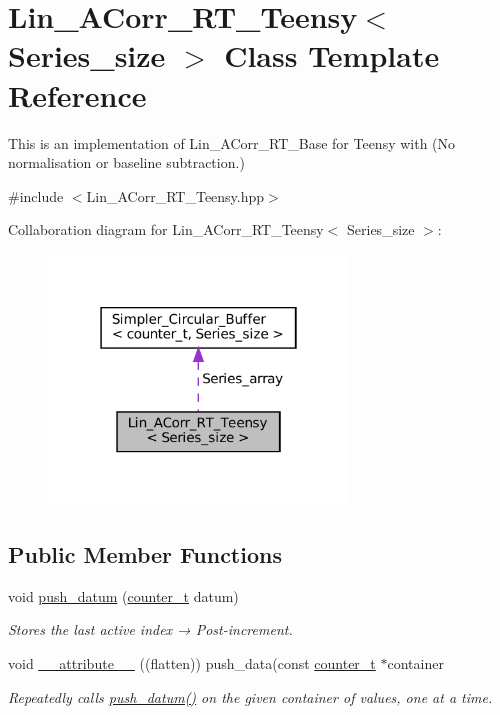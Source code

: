 \hypertarget{classLin__ACorr__RT__Teensy}{}\section{Lin\+\_\+\+A\+Corr\+\_\+\+R\+T\+\_\+\+Teensy$<$ Series\+\_\+size $>$ Class Template Reference}
\label{classLin__ACorr__RT__Teensy}


This is an implementation of Lin\+\_\+\+A\+Corr\+\_\+\+R\+T\+\_\+\+Base for Teensy with {\bfseries }(No normalisation or baseline subtraction.)  




{\ttfamily \#include $<$Lin\+\_\+\+A\+Corr\+\_\+\+R\+T\+\_\+\+Teensy.\+hpp$>$}



Collaboration diagram for Lin\+\_\+\+A\+Corr\+\_\+\+R\+T\+\_\+\+Teensy$<$ Series\+\_\+size $>$\+:
\nopagebreak
\begin{figure}[H]
\begin{center}
\leavevmode
\includegraphics[width=226pt]{classLin__ACorr__RT__Teensy__coll__graph}
\end{center}
\end{figure}
\subsection*{Public Member Functions}
\begin{DoxyCompactItemize}
\item 
void \hyperlink{classLin__ACorr__RT__Teensy_a0f5e5701923977b24a432ed0024c1368}{push\+\_\+datum} (\hyperlink{types_8hpp_a22f279793847eba127de149437848c48}{counter\+\_\+t} datum)
\begin{DoxyCompactList}\small\item\em Stores the last active index → Post-\/increment. \end{DoxyCompactList}\item 
void \hyperlink{classLin__ACorr__RT__Teensy_a0bfee7278e28c759cca2497749aeecf7}{\+\_\+\+\_\+attribute\+\_\+\+\_\+} ((flatten)) push\+\_\+data(const \hyperlink{types_8hpp_a22f279793847eba127de149437848c48}{counter\+\_\+t} $\ast$container
\begin{DoxyCompactList}\small\item\em Repeatedly calls {\ttfamily \hyperlink{classLin__ACorr__RT__Teensy_a0f5e5701923977b24a432ed0024c1368}{push\+\_\+datum()}} on the given container of values, one at a time. \end{DoxyCompactList}\end{DoxyCompactItemize}
